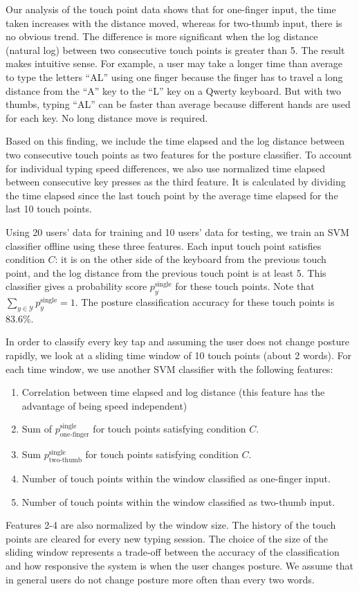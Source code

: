 \documentclass{sigchi}
\begin{document}
Our analysis of the touch point data shows that for one-finger input, the time taken increases with the distance moved, whereas for two-thumb input, there is no obvious trend. The
difference is more significant when the log distance (natural log)
between two consecutive touch points is greater than 5. The result makes intuitive sense. For example, a user may take a longer time than average to type the letters ``AL'' using one
finger because the finger has to travel a long distance from the ``A'' key to the ``L'' key on
a Qwerty keyboard. But with two thumbs, typing ``AL'' can be faster than average because different hands are used for each key.  No long distance move is required. 

Based on this finding, we include the time elapsed and the log distance
between two consecutive touch points as two features for the posture classifier. 
To account for individual typing speed differences, we also use normalized time 
elapsed between consecutive key presses as the third feature. It is calculated 
by dividing the time elapsed since the last touch point by the average time elapsed for the last 10 touch points.

Using 20 users’ data for training and 10 users’ data for testing, we train an SVM classifier offline using these three features.  Each input touch point satisfies condition $C$: it is 
on the other side of the keyboard from the previous touch point, and the log distance from the previous touch point is at least 5. This classifier gives a probability score $p_y^{\text{single}}$ for these touch points. Note that $\displaystyle\sum_{y \in \mathcal{Y}}p_y^{\text{single}} = 1$. The posture classification accuracy for these touch points is 83.6\%.
 
In order to classify every key tap and assuming the user does not change posture 
rapidly, we look at a sliding time window of 10 touch points (about 2 words). For 
each time window, we use another SVM classifier with the following features:
\begin{enumerate}
\item Correlation between time elapsed and log distance (this feature has the
advantage of being speed independent)
\item Sum of $p_\text{one-finger}^{\text{single}}$ for touch points satisfying condition $C$.
\item Sum $p_\text{two-thumb}^{\text{single}}$ for touch points satisfying condition $C$.
\item Number of touch points within the window classified as one-finger input.
\item Number of touch points within the window classified as two-thumb input.
\end{enumerate}
Features 2-4 are also normalized by the window size. The history of the touch points are cleared for every new typing session.
The choice of the size of the sliding window represents a trade-off between the 
accuracy of the classification and how responsive the system is when the user
changes posture. We assume that in general users do not change posture
more often than every two words. 
\end{document}
